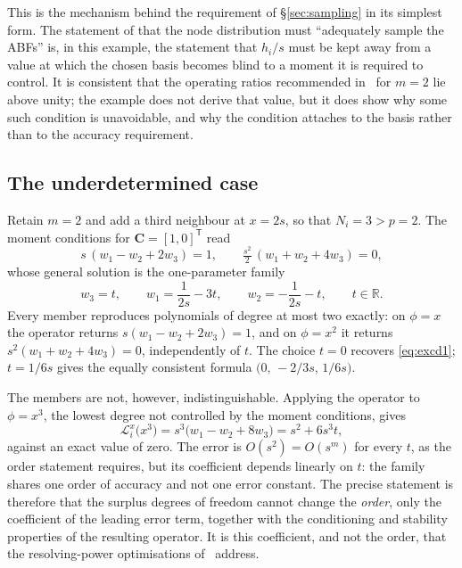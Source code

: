 \documentclass[11pt,a4paper]{article}
\begin{document}
This is the mechanism behind the requirement of \S\ref{sec:sampling} in its simplest
form. The statement of \cite[\S 3.2]{KLN2020} that the node distribution must
``adequately sample the ABFs'' is, in this example, the statement that $h_i/s$ must be
kept away from a value at which the chosen basis becomes blind to a moment it is
required to control. It is consistent that the operating ratios recommended
in~\cite[\S 5]{KL2021} for $m=2$ lie above unity; the example does not derive that
value, but it does show why some such condition is unavoidable, and why the condition
attaches to the basis rather than to the accuracy requirement.

\subsection{The underdetermined case}
\label{app:under}

Retain $m=2$ and add a third neighbour at $x=2s$, so that $N_i=3>p=2$. The moment
conditions for $\bm C=[1,0]^{\mathsf T}$ read
\begin{equation}
s\,(w_1-w_2+2w_3)=1,
\qquad
\tfrac{s^{2}}{2}\,(w_1+w_2+4w_3)=0,
\label{eq:exunder}
\end{equation}
whose general solution is the one-parameter family
\begin{equation}
w_3=t,
\qquad
w_1=\frac{1}{2s}-3t,
\qquad
w_2=-\frac{1}{2s}-t,
\qquad t\in\mathbb R .
\label{eq:exfamily}
\end{equation}
Every member reproduces polynomials of degree at most two exactly: on $\phi=x$ the
operator returns $s(w_1-w_2+2w_3)=1$, and on $\phi=x^{2}$ it returns
$s^{2}(w_1+w_2+4w_3)=0$, independently of $t$. The choice $t=0$ recovers
\eqref{eq:excd1}; $t=1/6s$ gives the equally consistent formula
$\bigl(0,\,-2/3s,\,1/6s\bigr)$.

The members are not, however, indistinguishable. Applying the operator to $\phi=x^{3}$,
the lowest degree not controlled by the moment conditions, gives
\begin{equation}
\mathcal L^{x}_i\bigl(x^{3}\bigr)=s^{3}\bigl(w_1-w_2+8w_3\bigr)=s^{2}+6s^{3}t ,
\label{eq:exleading}
\end{equation}
against an exact value of zero. The error is $O(s^{2})=O(s^{m})$ for every $t$, as the
order statement requires, but its coefficient depends linearly on $t$: the family shares
one order of accuracy and not one error constant. The precise
statement is therefore that the surplus degrees of freedom cannot change the
\emph{order}, only the coefficient of the leading error term, together with the
conditioning and stability properties of the resulting operator. It is this coefficient,
and not the order, that the resolving-power optimisations of~\cite{Broadley2025,%
Broadley2026} address.
\end{document}
